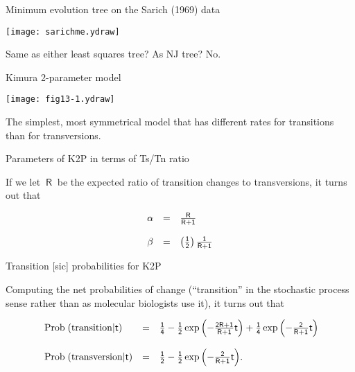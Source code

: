 \documentclass[bluish,slideColor,colorBG,pdf]{prosper}
\def\prob{{\rm \;Prob\;}}
\begin{document}
\begin{slide}[Replace]{Minimum evolution tree on the Sarich (1969) data}

\centerline{\texttt{[image: sarichme.ydraw]}}

Same as either least squares tree?  As NJ tree?  No.

\end{slide}

\begin{slide}[Replace]{Kimura 2-parameter model}

\centerline{\texttt{[image: fig13-1.ydraw]}}
\bigskip

The simplest, most symmetrical model that has different rates for transitions
than for transversions.

\end{slide}

\begin{slide}[Replace]{Parameters of K2P in terms of Ts/Tn ratio}
\bigskip

If we let $\ \mathsf{R}\ $ be the expected ratio of transition changes to
transversions, it turns out that

{
\[
\begin{array}{c c l}
\mathsf{\alpha} & \mathsf{=} & \mathsf{\frac{R}{R+1}}\\
 & & \\
\mathsf{\beta} & \mathsf{=} & \mathsf{\left(\frac{1}{2}\right)\frac{1}{R+1}}
\end{array}
\]
}

\end{slide}

\begin{slide}[Replace]{Transition [sic] probabilities for K2P}
\bigskip

Computing the net probabilities of change (``transition'' in the stochastic
process sense rather than as molecular biologists use it), it turns out that

\[
\begin{array}{l c l}
\mathsf{\prob({\rm transition}|t)} & \mathsf{=} &  \mathsf{\frac{1}{4} - \frac{1}{2} \exp\left(- \frac{2R+1}{R+1}t\right) + \frac{1}{4} \exp\left(-\frac{2}{R+1}t\right)} \\
                                 &   & \\
\mathsf{\prob({\rm transversion}|t)} & \mathsf{=} & \mathsf{\frac{1}{2} - \frac{1}{2} \exp\left(-\frac{2}{R+1}t\right)}.
\end{array}
\]

\end{slide}
\end{document}
